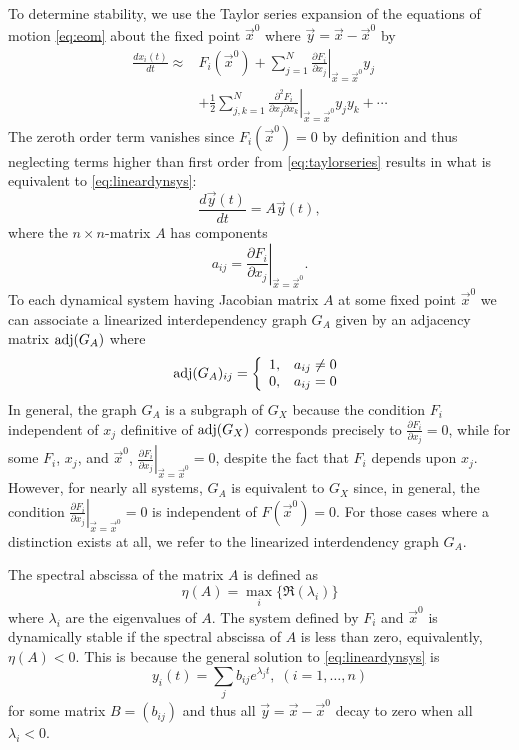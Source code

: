 To determine stability, we use the Taylor series expansion of the equations of motion \ref{eq:eom} about the fixed point $\vec{x}^0$ where $\vec{y} = \vec{x} - \vec{x}^0$ by
\begin{equation}\label{eq:taylorseries}
\begin{aligned}
\frac{dx_i(t)}{dt} \approx & F_i(\vec{x}^0)
+ \sum_{j=1}^{N} \left. \frac{\partial F_i}{\partial x_j} \right|_{\vec{x} = \vec{x}^0} y_j\\
& + \frac{1}{2}\sum_{j,k=1}^{N} \left. \frac{\partial^2 F_i}{\partial x_j \partial x_k} \right|_{\vec{x} = \vec{x}^0} y_j y_k + \cdots
\end{aligned}
\end{equation}
The zeroth order term vanishes since $F_i(\vec{x}^0)=0$ by definition and thus neglecting terms higher than first order from \ref{eq:taylorseries} results in what is equivalent to \ref{eq:lineardynsys}:
\begin{equation*}
\frac{d\vec{y}(t)}{dt} = A \vec{y}(t),
\end{equation*}
where the $n \times n$-matrix $A$ has components
$$
a_{ij} = \left. \frac{\partial F_i}{\partial x_j} \right|_{\vec{x} = \vec{x}^0}.
$$
To each dynamical system having Jacobian matrix $A$ at some fixed point $\vec{x}^0$ we can associate a linearized interdependency graph $G_A$ given by an adjacency matrix $\mathrm{adj}(G_A)$ where
 \begin{displaymath}
   \mathrm{adj}(G_A)_{ij} = \left\{
     \begin{array}{lr}
       1, & a_{ij} \neq 0\\
       0, & a_{ij} = 0
     \end{array}
   \right.
\end{displaymath}
In general, the graph $G_A$ is a subgraph of $G_X$ because the condition $F_i$ independent of $x_j$ definitive of $\mathrm{adj}(G_X)$ corresponds precisely to $\frac{\partial F_i}{\partial x_j}=0$, while for some $F_i$, $x_j$, and $\vec{x}^0$, $\left. \frac{\partial F_i}{\partial x_j} \right|_{\vec{x} = \vec{x}^0} = 0$, despite the fact that $F_i$ depends upon $x_j$. However, for nearly all systems, $G_A$ is equivalent to $G_X$ since, in general, the condition $\left. \frac{\partial F_i}{\partial x_j} \right|_{\vec{x} = \vec{x}^0} = 0$ is independent of $F(\vec{x}^0)=0$. For those cases where a distinction exists at all, we refer to the linearized interdendency graph $G_A$.

The spectral abscissa of the matrix $A$ is defined as
$$
\eta(A) = \max_i \{\Re(\lambda_i)\}
$$
where $\lambda_i$ are the eigenvalues of $A$. The system defined by $F_i$ and $\vec{x}^0$ is dynamically stable if the spectral abscissa of $A$ is less than zero, equivalently, $\eta(A) < 0$. This is because the general solution to \ref{eq:lineardynsys} is
$$
y_i(t) = \sum_j b_{ij} e^{\lambda_j t}, \; (i=1,\ldots,n)
$$
for some matrix $B=(b_{ij})$ and thus all $\vec{y} = \vec{x} - \vec{x}^0$ decay to zero when all $\lambda_i < 0$.

